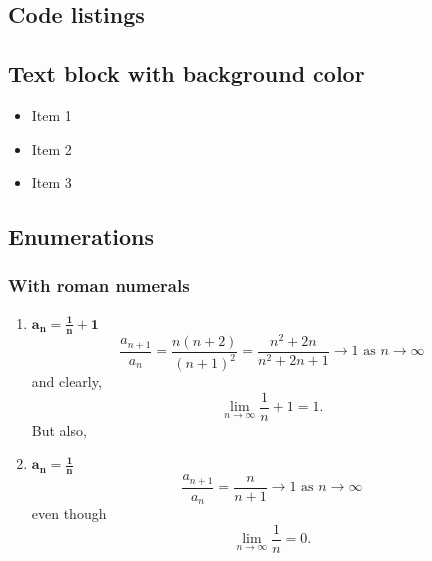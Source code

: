 \documentclass[MathsNotesBase.tex]{subfiles}
\begin{document}
	\subsection{Code listings}
	
	
	\subsection{Text block with background color}
	\begin{tcolorbox}[enhanced jigsaw,colback=note_bg,boxrule=0pt,arc=0pt]
		\begin{itemize}
			\item Item 1
			\item Item 2
			\item Item 3
		\end{itemize}
	\end{tcolorbox}

	\subsection{Enumerations}
	\subsubsection{With roman numerals}
	\begin{enumerate}[label=(\roman*)]
		\item{${\bm{ a_n = \frac{1}{n} + 1 }}$}
		\[ \frac{a_{n+1}}{a_n} = \frac{n(n+2)}{(n+1)^2} =\frac{n^2 + 2n}{n^2 + 2n + 1} \to 1 \text{ as } n \to \infty \]
		and clearly,
		\[ \lim_{n \to \infty} \frac{1}{n} + 1 = 1. \]
		But also,
		\item{${\bm{ a_n = \frac{1}{n} }}$}
		\[  \frac{a_{n+1}}{a_n} = \frac{n}{n+1} \to 1 \text{ as } n \to \infty \]
		even though
		\[ \lim_{n \to \infty} \frac{1}{n} = 0. \]
	\end{enumerate}
	
\end{document}
